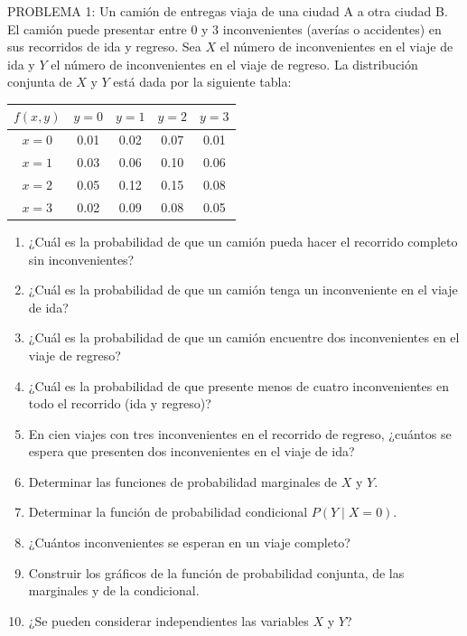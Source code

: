 \documentclass[10pt,letterpaper]{article}
\begin{document}
	\pagestyle{empty}
PROBLEMA 1: Un camión de entregas viaja de una ciudad A a otra ciudad B. El camión puede presentar entre 0 y 3 inconvenientes (averías o accidentes) en sus recorridos de ida y regreso. Sea \(X\) el número de inconvenientes en el viaje de ida y \(Y\) el número de inconvenientes en el viaje de regreso. La distribución conjunta de \(X\) y \(Y\) está dada por la siguiente tabla:
	
	\begin{center}
		\begin{tabular}{c|cccc}
			\toprule
			\(f(x,y)\) & \(y=0\) & \(y=1\) & \(y=2\) & \(y=3\) \\
			\midrule
			\(x=0\) & 0.01 & 0.02 & 0.07 & 0.01 \\
			\(x=1\) & 0.03 & 0.06 & 0.10 & 0.06 \\
			\(x=2\) & 0.05 & 0.12 & 0.15 & 0.08 \\
			\(x=3\) & 0.02 & 0.09 & 0.08 & 0.05 \\
			\bottomrule
		\end{tabular}
	\end{center}
	
	\begin{enumerate}
		\item ¿Cuál es la probabilidad de que un camión pueda hacer el recorrido completo sin inconvenientes?
		\item ¿Cuál es la probabilidad de que un camión tenga un inconveniente en el viaje de ida?
		\item ¿Cuál es la probabilidad de que un camión encuentre dos inconvenientes en el viaje de regreso?
		\item ¿Cuál es la probabilidad de que presente menos de cuatro inconvenientes en todo el recorrido (ida y regreso)?
		\item En cien viajes con tres inconvenientes en el recorrido de regreso, ¿cuántos se espera que presenten dos inconvenientes en el viaje de ida?
		\item Determinar las funciones de probabilidad marginales de \(X\) y \(Y\).
		\item Determinar la función de probabilidad condicional \(P(Y\mid X=0)\).
		\item ¿Cuántos inconvenientes se esperan en un viaje completo?
		\item Construir los gráficos de la función de probabilidad conjunta, de las marginales y de la condicional.
		\item ¿Se pueden considerar independientes las variables \(X\) y \(Y\)?
	\end{enumerate}
\end{document}
